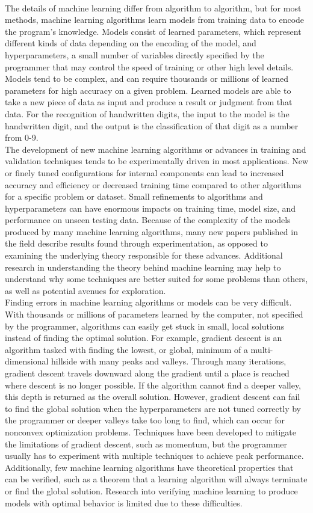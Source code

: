 \\The details of machine learning differ from algorithm to algorithm, but for most methods, machine learning algorithms learn models from training data to encode the program's knowledge. Models consist of learned parameters, which represent different kinds of data depending on the encoding of the model, and hyperparameters, a small number of variables directly specified by the programmer that may control the speed of training or other high level details. Models tend to be complex, and can require thousands or millions of learned parameters for high accuracy on a given problem. Learned models are able to take a new piece of data as input and produce a result or judgment from that data. For the recognition of handwritten digits, the input to the model is the handwritten digit, and the output is the classification of that digit as a number from 0-9.
\\The development of new machine learning algorithms or advances in training and validation techniques tends to be experimentally driven in most applications. New or finely tuned configurations for internal components can lead to increased accuracy and efficiency or decreased training time compared to other algorithms for a specific problem or dataset. Small refinements to algorithms and hyperparameters can have enormous impacts on training time, model size, and performance on unseen testing data. Because of the complexity of the models produced by many machine learning algorithms, many new papers published in the field describe results found through experimentation, as opposed to examining the underlying theory responsible for these advances. Additional research in understanding the theory behind machine learning may help to understand why some techniques are better suited for some problems than others, as well as potential avenues for exploration.
\\Finding errors in machine learning algorithms or models can be very difficult. With thousands or millions of parameters learned by the computer, not specified by the programmer, algorithms can easily get stuck in small, local solutions instead of finding the optimal solution. For example, gradient descent is an algorithm tasked with finding the lowest, or global, minimum of a multi-dimensional hillside with many peaks and valleys. Through many iterations, gradient descent travels downward along the gradient until a place is reached where descent is no longer possible. If the algorithm cannot find a deeper valley, this depth is returned as the overall solution. However, gradient descent can fail to find the global solution when the hyperparameters are not tuned correctly by the programmer or deeper valleys take too long to find, which can occur for nonconvex optimization problems. Techniques have been developed to mitigate the limitations of gradient descent, such as momentum, but the programmer usually has to experiment with multiple techniques to achieve peak performance. Additionally, few machine learning algorithms have theoretical properties that can be verified, such as a theorem that a learning algorithm will always terminate or find the global solution. Research into verifying machine learning to produce models with optimal behavior is limited due to these difficulties.

